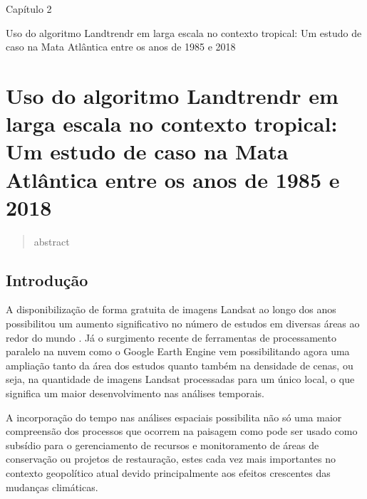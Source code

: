 \begin{titlepage}
    \centering
    \vspace*{\fill}

    \vspace*{0.5cm}
    
    \Large%
    Capítulo 2

    \vspace*{1cm}

    \Large%
    Uso do algoritmo Landtrendr em larga escala no contexto tropical: Um estudo de caso na Mata Atlântica entre os anos de 1985 e 2018

    \vspace*{5cm}


    \vspace*{\fill}
\end{titlepage}

\section{Uso do algoritmo Landtrendr em larga escala no contexto tropical: Um estudo de caso na Mata Atlântica entre os anos de 1985 e 2018}

\begin{abstract}
    abstract
\end{abstract}

\subsection{Introdução}
\hspace{13pt} A disponibilização de forma gratuita de imagens Landsat ao longo dos anos possibilitou um aumento significativo no número de estudos em diversas áreas ao redor do mundo \citep{ZHU2019382, WULDER20122}. Já o surgimento recente de ferramentas de processamento paralelo na nuvem como o Google Earth Engine \citep{GORELICK201718} vem possibilitando agora uma ampliação tanto da área dos estudos quanto também na densidade de cenas, ou seja, na quantidade de imagens Landsat processadas para um único local, o que significa um maior desenvolvimento nas análises temporais.

A incorporação do tempo nas análises espaciais possibilita não só uma maior compreensão dos processos que ocorrem na paisagem como pode ser usado como subsídio para o gerenciamento de recursos e monitoramento de áreas de conservação ou projetos de restauração, estes cada vez mais importantes no contexto geopolítico atual devido principalmente aos efeitos crescentes das mudanças climáticas.

